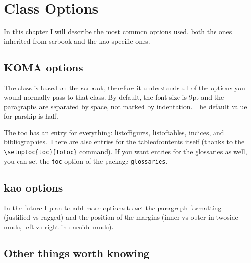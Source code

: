 \setchapterpreamble[u]{\margintoc[*-3]}
\chapter{Class Options}

In this chapter I will describe the most common options used, both the 
ones inherited from scrbook and the kao-specific ones.

\section{KOMA options}

The class is based on the scrbook, therefore it understands all of the 
options you would normally pass to that class. By default, the font size 
is 9pt and the paragraphs are separated by space, not marked by 
indentation. The default value for parskip is half.

The toc has an entry for everything: listoffigures, listoftables, 
indices, and bibliographies. There are also entries for the 
tableofcontents itself (thanks to the \verb|\setuptoc{toc}{totoc}| 
command). If you want entries for the glossaries as well, you can set 
the \verb|toc| option of the package \verb|glossaries|.

\section{kao options}

In the future I plan to add more options to set the paragraph formatting 
(justified vs ragged) and the position of the margins (inner vs outer in 
twoside mode, left vs right in oneside mode). 

\section{Other things worth knowing}

